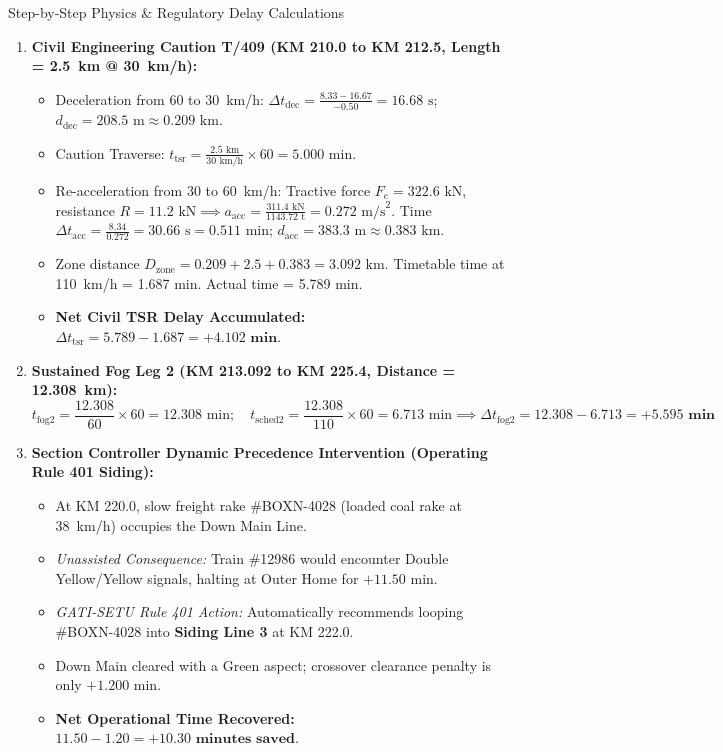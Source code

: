 \documentclass[10pt, a4paper]{article}
\begin{document}
\begin{statutebox}{Step-by-Step Physics \& Regulatory Delay Calculations}
\begin{enumerate}[leftmargin=4mm, itemsep=2pt]
  \item \textbf{Civil Engineering Caution T/409 (KM 210.0 to KM 212.5, Length = 2.5~km @ 30~km/h):}
  \begin{itemize}[leftmargin=3mm]
    \item Deceleration from 60 to 30~km/h: $\Delta t_{\text{dec}} = \frac{8.33 - 16.67}{-0.50} = 16.68\text{ s}$; $d_{\text{dec}} = 208.5\text{ m} \approx 0.209\text{ km}$.
    \item Caution Traverse: $t_{\text{tsr}} = \frac{2.5\text{ km}}{30\text{ km/h}} \times 60 = 5.000\text{ min}$.
    \item Re-acceleration from 30 to 60~km/h: Tractive force $F_e = 322.6\text{ kN}$, resistance $R = 11.2\text{ kN} \implies a_{\text{acc}} = \frac{311.4\text{ kN}}{1143.72\text{ t}} = 0.272\text{ m/s}^2$. Time $\Delta t_{\text{acc}} = \frac{8.34}{0.272} = 30.66\text{ s} = 0.511\text{ min}$; $d_{\text{acc}} = 383.3\text{ m} \approx 0.383\text{ km}$.
    \item Zone distance $D_{\text{zone}} = 0.209 + 2.5 + 0.383 = 3.092\text{ km}$. Timetable time at 110~km/h = 1.687 min. Actual time = 5.789 min.
    \item \textbf{Net Civil TSR Delay Accumulated:} $\Delta t_{\text{tsr}} = 5.789 - 1.687 = \mathbf{+4.102\text{ min}}$.
  \end{itemize}

  \item \textbf{Sustained Fog Leg 2 (KM 213.092 to KM 225.4, Distance = 12.308~km):}
  \begin{equation*}
    t_{\text{fog2}} = \frac{12.308}{60} \times 60 = 12.308\text{ min}; \quad t_{\text{sched2}} = \frac{12.308}{110} \times 60 = 6.713\text{ min} \implies \Delta t_{\text{fog2}} = 12.308 - 6.713 = \mathbf{+5.595\text{ min}}
  \end{equation*}

  \item \textbf{Section Controller Dynamic Precedence Intervention (Operating Rule 401 Siding):}
  \begin{itemize}[leftmargin=3mm]
    \item At KM 220.0, slow freight rake \#BOXN-4028 (loaded coal rake at 38~km/h) occupies the Down Main Line.
    \item \textit{Unassisted Consequence:} Train \#12986 would encounter Double Yellow/Yellow signals, halting at Outer Home for $+11.50\text{ min}$.
    \item \textit{GATI-SETU Rule 401 Action:} Automatically recommends looping \#BOXN-4028 into \textbf{Siding Line 3} at KM 222.0.
    \item Down Main cleared with a Green aspect; crossover clearance penalty is only $+1.200\text{ min}$.
    \item \textbf{Net Operational Time Recovered:} $11.50 - 1.20 = \mathbf{+10.30\text{ minutes saved}}$.
  \end{itemize}
\end{enumerate}
\end{statutebox}
\end{document}
